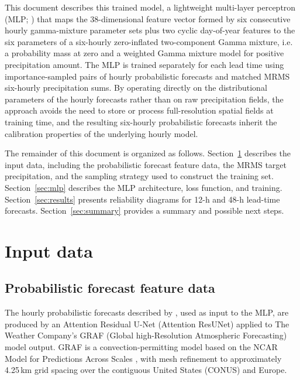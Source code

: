 \documentclass[11pt]{article}
\begin{document}
This document describes this trained model, a lightweight multi-layer perceptron
(MLP; \citealt{rumelhart1986}) that maps the 38-dimensional feature vector formed
by six consecutive hourly gamma-mixture parameter sets plus two cyclic
day-of-year features to the six parameters of a
six-hourly zero-inflated two-component Gamma mixture, i.e. a probability mass at zero
and a weighted Gamma mixture model for positive precipitation amount.  The MLP is trained separately
for each lead time using importance-sampled pairs of hourly probabilistic forecasts
and matched MRMS six-hourly precipitation sums.  By operating directly on the
distributional parameters of the hourly forecasts rather than on raw precipitation
fields, the approach avoids the need to store or process full-resolution spatial
fields at training time, and the resulting six-hourly probabilistic forecasts
inherit the calibration properties of the underlying hourly model.

The remainder of this document is organized as follows.
Section~\ref{sec:hourly} describes the input data, including the probabilistic
forecast feature data, the MRMS target precipitation, and the sampling strategy
used to construct the training set.
Section~\ref{sec:mlp} describes the MLP architecture, loss function, and training.
Section~\ref{sec:results} presents reliability diagrams for 12-h and 48-h lead-time
forecasts.
Section~\ref{sec:summary} provides a summary and possible next steps.

\section{Input data}
\label{sec:hourly}

\subsection{Probabilistic forecast feature data}
\label{sec:input_feat}

The hourly probabilistic forecasts described by \citet{hamill2026a}, used as input
to the MLP, are produced by an Attention Residual U-Net (Attention ResUNet) applied
to The Weather Company's GRAF (Global high-Resolution Atmospheric Forecasting) model
output.  GRAF is a convection-permitting model based on the NCAR Model for Predictions
Across Scales \citep[MPAS;][]{skamarock2012}, with mesh refinement to approximately 4.25\,km
grid spacing over the contiguous United States (CONUS) and Europe.
\end{document}
